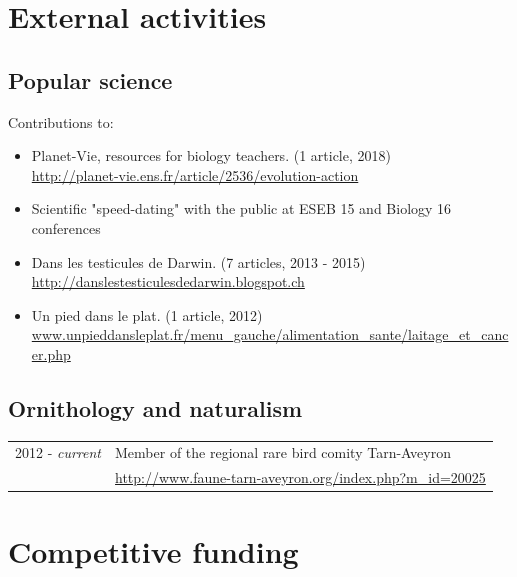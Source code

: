 \documentclass[a4paper,10pt]{article} %
\begin{document}
\section*{External activities}

\subsection*{Popular science}

Contributions to:
\begin{itemize}
\item Planet-Vie, resources for biology teachers. (1 article, 2018) \\ \url{http://planet-vie.ens.fr/article/2536/evolution-action}
\item Scientific "speed-dating" with the public at ESEB 15 and Biology 16 conferences
\item Dans les testicules de Darwin. (7 articles, 2013 - 2015) \\ \url{http://danslestesticulesdedarwin.blogspot.ch}
\item Un pied dans le plat. (1 article, 2012) \\ \url{www.unpieddansleplat.fr/menu_gauche/alimentation_sante/laitage_et_cancer.php}
\end{itemize}

\subsection*{Ornithology and naturalism}
\begin{tabular}{p{4cm}|p{11cm}}
\hfill \textsc{2012 -} \emph{current} & Member of the regional rare bird comity Tarn-Aveyron\\
															& \url{http://www.faune-tarn-aveyron.org/index.php?m_id=20025}\\
\end{tabular}

\section*{Competitive funding}
\end{document}
